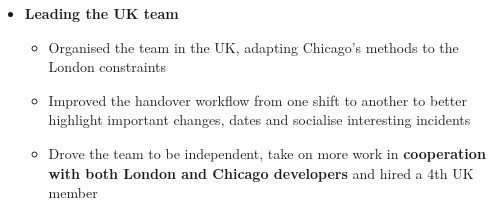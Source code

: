 \documentclass[11pt,a4paper,sans]{moderncv}        %
\begin{document}
{\begin{itemize}
\begin{itemize}
		\item Suggested and implemented a set of new standards for the growing scope of OTC 3rd-party applications which can't follow the regular requirements of in-house applications
		\item Wrote a \textbf{Python alerter} using Prometheus to \textbf{detect clock sync deviations} breaching MiFID thresholds. Set up a workflow to track these breaches with Compliance
	\end{itemize}
	\item \textbf{Leading the UK team}
	\begin{itemize}
		\item Organised the team in the UK, adapting Chicago's methods to the London constraints
		\item Improved the handover workflow from one shift to another to better highlight important changes, dates and socialise interesting incidents
		\item Drove the team to be independent, take on more work in \textbf{cooperation with both London and Chicago developers} and hired a 4th UK member \newline
	\end{itemize}
\end{itemize}}
\end{document}
